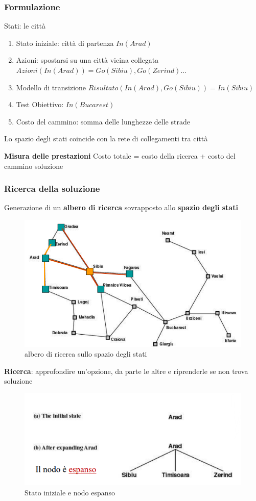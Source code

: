 \documentclass{article}
\begin{document}
\subsubsection{Formulazione}
Stati: le città
\begin{enumerate}
    \item Stato iniziale: città di partenza $In(Arad)$
    \item Azioni: spostarsi su una città vicina collegata $Azioni(In(Arad)) = {Go(Sibiu), Go(Zerind) ...}$
    \item Modello di transizione $Risultato(In(Arad), Go(Sibiu)) = In(Sibiu)$
    \item Test Obiettivo: ${In(Bucarest)}$
    \item Costo del cammino: somma delle lunghezze delle strade
\end{enumerate}

Lo spazio degli stati coincide con la rete di collegamenti tra città

\textbf{Misura delle prestazioni}
\newline Costo totale = costo della ricerca + costo del cammino soluzione

\subsubsection{Ricerca della soluzione}
Generazione di un \textbf{albero di ricerca} sovrapposto allo \textbf{spazio degli stati}
\begin{figure}
    \centering
    \includegraphics[width = \linewidth]{11.png}
    \caption{albero di ricerca sullo spazio degli stati}
\end{figure}
\textbf{Ricerca}: approfondire un'opzione, da parte le altre e riprenderle se non trova soluzione
\begin{figure}
    \centering
    \includegraphics{12.png}
    \caption{Stato iniziale e nodo espanso}
\end{figure}
\end{document}
